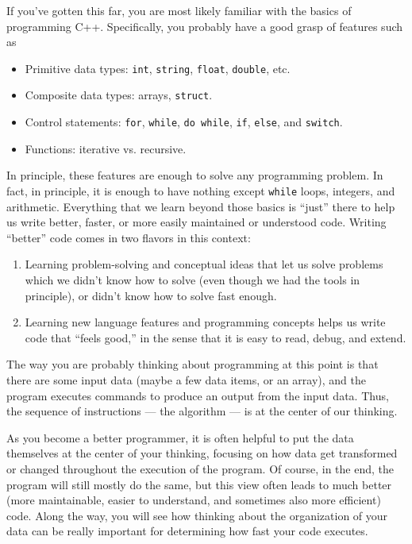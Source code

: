If you've gotten this far, you are most likely familiar with the basics of programming C++.
Specifically, you probably have a good grasp of features such as

\begin{itemize}
	\item Primitive data types: \texttt{int}, \texttt{string}, \texttt{float}, \texttt{double}, etc.
	\item Composite data types: arrays, \texttt{struct}.
	\item Control statements: \texttt{for}, \texttt{while}, \texttt{do while}, \texttt{if}, \texttt{else}, and \texttt{switch}.
	\item Functions: iterative vs. recursive.
\end{itemize}

In principle, these features are enough to solve any programming problem.
In fact, in principle, it is enough to have nothing except \texttt{while} loops, integers, and arithmetic.
Everything that we learn beyond those basics is ``just'' there to help us write better, faster, or more easily maintained or
understood code.
Writing ``better'' code comes in two flavors in this context:
\begin{enumerate}
\item Learning problem-solving and conceptual ideas that let us solve
  problems which we didn't know how to solve (even though we had the
  tools in principle), or didn't know how to solve fast enough.
\item Learning new language features and programming concepts helps us
  write code that ``feels good,'' in the sense that it is easy to
  read, debug, and extend.
\end{enumerate}

The way you are probably thinking about programming at this
point is that there are some input data
(maybe a few data items, or an array),
and the program executes commands to produce an output from the input data.
Thus, the sequence of instructions --- the algorithm --- is at
the center of our thinking.

As you become a better programmer, it is often helpful to put the data
themselves at the center of your thinking, focusing on how data
get transformed or changed throughout the execution of the program. 
Of course, in the end, the program will still mostly do the same,
but this view often leads to much better (more maintainable, easier to
understand, and sometimes also more efficient) code. 
Along the way, you will see how thinking about the organization of your
data can be really important for determining how fast your code
executes.

